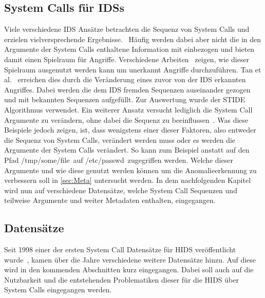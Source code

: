         \subsection{System Calls für \aclp{IDS}}
            Viele verschiedene \ac{IDS} Ansätze betrachten die Sequenz von System Calls und erzielen vielversprechende Ergebnisse.~\cite{MAGGI}
            Häufig werden dabei aber nicht die in den Argumente der System Calls enthaltene Information mit einbezogen und bieten damit einen Spielraum für Angriffe.
            Verschiedene Arbeiten~\cite{Syscallseqexploit1, Syscallseqexploit2, Syscallseqexploit3} zeigen, wie dieser Spielraum ausgenutzt werden kann um unerkannt Angriffe durchzuführen. 
            Tan et al.~\cite{Syscallseqexploit3} erreichen dies durch die Veränderung eines zuvor von der \ac{IDS} erkannten Angriffes.
            Dabei werden die dem \ac{IDS} fremden Sequenzen auseinander gezogen und mit bekannten Sequenzen aufgefüllt.
            Zur Auswertung wurde der \acf{STIDE} Algorithmus verwendet.
            Ein weiterer Ansatz versucht lediglich die System Call Argumente zu verändern, ohne dabei die Sequenz zu beeinflussen~\cite{Syscallseqexploit1}.
            Was diese Beispiele jedoch zeigen, ist, dass wenigstens einer dieser Faktoren, also entweder die Sequenz von System Calls, verändert werden muss oder es werden die Argumente der System Calls verändert.
            So kann zum Beispiel anstatt auf den Pfad \glqq /tmp/some/file\grqq \ auf \glqq /etc/passwd\grqq \ zugegriffen werden. 
            Welche dieser Argumente und wie diese genutzt werden können um die Anomalieerkennung zu verbessern soll in \autoref{sec:Meta} untersucht werden.
            In dem nachfolgenden Kapitel wird nun auf verschiedene Datensätze, welche System Call Sequenzen und teilweise Argumente und weiter Metadaten enthalten, eingegangen.

        \subsection{Datensätze}\label{sec:Datensatz}
            Seit 1998 einer der ersten System Call Datensätze für \ac{HIDS} veröffentlicht wurde~\cite{DARPA, KDD},
            kamen über die Jahre verschiedene weitere Datensätze hinzu.
            Auf diese wird in den kommenden Abschnitten kurz eingegangen.
            Dabei soll auch auf die Nutzbarkeit und die entstehenden Problematiken dieser für die \ac{HIDS} über System Calls eingegangen werden.
